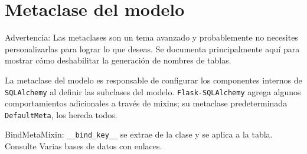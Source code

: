 \documentclass[10pt,letterpaper,notumble]{leaflet}
\begin{document}
{\begin{minipage}{1.65\linewidth}
			\vspace*{-0.5cm}
			
			\section{Metaclase del modelo} 
			
			Advertencia: Las metaclases son un tema avanzado y probablemente no necesites personalizarlas para lograr lo que deseas. Se documenta principalmente aquí para mostrar cómo deshabilitar la generación de nombres de tablas.
			
			La metaclase del modelo es responsable de configurar los componentes internos de \texttt{SQLAlchemy} al definir las subclases del modelo. \texttt{Flask-SQLAlchemy} agrega algunos comportamientos adicionales a través de mixins; su metaclase predeterminada \texttt{DefaultMeta}, los hereda todos.
			
			BindMetaMixin: \texttt{\_\_bind\_key\_\_} se extrae de la clase y se aplica a la tabla. Consulte Varias bases de datos con enlaces.
			
		\end{minipage}
	}
	\clearpage
\end{document}
